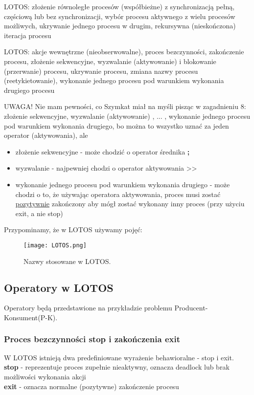 \documentclass[a4paper,15pt]{article}
\newcommand{\issue}[2]{
    \begin{tcolorbox}[colback=issueColor!5!white,colframe=issueColor,title={Zagadnienie #1}]
        #2
    \end{tcolorbox}
}
\begin{document}
\issue{5}{
LOTOS: złożenie równoległe procesów (współbieżne) z synchronizacją
pełną, częściową lub bez synchronizacji, wybór procesu aktywnego z wielu
procesów możliwych, ukrywanie jednego procesu w drugim, rekursywna
(nieskończona) iteracja procesu
}


\issue{8}{
LOTOS: akcje wewnętrzne (nieobserwowalne), proces bezczynności,
zakończenie procesu, złożenie sekwencyjne, wyzwalanie (aktywowanie) i
blokowanie (przerwanie) procesu, ukrywanie procesu, zmiana nazwy procesu
(reetykietowanie), wykonanie jednego procesu pod warunkiem wykonania
drugiego procesu
}

UWAGA! Nie mam pewności, co Szymkat miał na myśli pisząc w zagadnieniu 8: złożenie sekwencyjne, wyzwalanie (aktywowanie) , ... , wykonanie jednego procesu pod warunkiem wykonania drugiego, bo można to wszystko uznać za jeden operator (aktywowania), ale
\begin{itemize}
\item złożenie sekwencyjne - może chodzić o operator średnika \textbf{;}
\item wyzwalanie - najpewniej chodzi o operator aktywowania >>
\item wykonanie jednego procesu pod warunkiem wykonania drugiego - może chodzi o to, że używając operatora aktywowania, proces musi zostać \underline{pozytywnie} zakończony aby mógł zostać wykonany inny proces (przy użyciu exit, a nie stop)
\end{itemize}


Przypominamy, że w LOTOS używamy pojęć:
\begin{figure}[H]
\centerline{\texttt{[image: LOTOS.png]}}
\caption{Nazwy stosowane w LOTOS.}
\label{fig:nazwyLOTOS}
\end{figure}


\subsection{Operatory w LOTOS}
Operatory będą przedstawione na przykładzie problemu Producent-Konsument(P-K). \\


\subsubsection{Proces bezczynności stop i zakończenia exit}
W LOTOS istnieją dwa predefiniowane wyrażenie behawioralne - stop i exit. \\
\textbf{stop} - reprezentuje proces zupełnie nieaktywny, oznacza deadlock lub brak możliwości wykonania akcji \\
\textbf{exit} - oznacza normalne (pozytywne) zakończenie procesu
\end{document}
